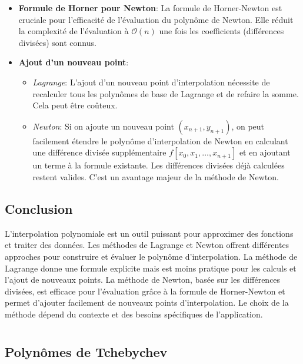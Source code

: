\documentclass[oneside]{book}
\begin{document}
\begin{itemize}
    \item \textbf{Formule de Horner pour Newton}: La formule de Horner-Newton est cruciale pour l'efficacité de l'évaluation du polynôme de Newton. Elle réduit la complexité de l'évaluation à $\mathcal{O}(n)$ une fois les coefficients (différences divisées) sont connus.
    \item \textbf{Ajout d'un nouveau point}:
    \begin{itemize}
        \item \textit{Lagrange}: L'ajout d'un nouveau point d'interpolation nécessite de recalculer tous les polynômes de base de Lagrange et de refaire la somme. Cela peut être coûteux.
        \item \textit{Newton}:  Si on ajoute un nouveau point $(x_{n+1}, y_{n+1})$, on peut facilement étendre le polynôme d'interpolation de Newton en calculant une différence divisée supplémentaire $f[x_0, x_1, \dots, x_{n+1}]$ et en ajoutant un terme à la formule existante. Les différences divisées déjà calculées restent valides. C'est un avantage majeur de la méthode de Newton.
    \end{itemize}
\end{itemize}

\section{Conclusion}

L'interpolation polynomiale est un outil puissant pour approximer des fonctions et traiter des données. Les méthodes de Lagrange et Newton offrent différentes approches pour construire et évaluer le polynôme d'interpolation. La méthode de Lagrange donne une formule explicite mais est moins pratique pour les calculs et l'ajout de nouveaux points. La méthode de Newton, basée sur les différences divisées, est efficace pour l'évaluation grâce à la formule de Horner-Newton et permet d'ajouter facilement de nouveaux points d'interpolation. Le choix de la méthode dépend du contexte et des besoins spécifiques de l'application.\chapter{}
\sloppy

\section{Polynômes de Tchebychev}
\end{document}
